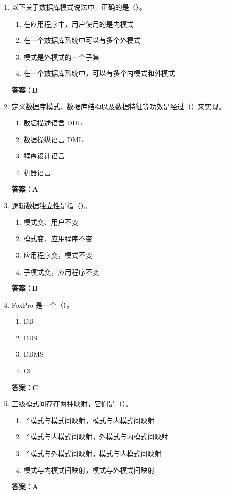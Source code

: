 \documentclass[12pt, a4paper]{article}
\begin{document}
\begin{enumerate}[label=\arabic*.]
	\item 以下关于数据库模式说法中，正确的是（\quad）。
	      \begin{enumerate}
		      \item 在应用程序中，用户使用的是内模式
		      \item 在一个数据库系统中可以有多个外模式
		      \item 模式是外模式的一个子集
		      \item 在一个数据库系统中，可以有多个内模式和外模式
	      \end{enumerate}
	      \textbf{答案：B}

	\item 定义数据库模式、数据库结构以及数据特征等功效是经过（\quad）来实现。
	      \begin{enumerate}
		      \item 数据描述语言 DDL
		      \item 数据操纵语言 DML
		      \item 程序设计语言
		      \item 机器语言
	      \end{enumerate}
	      \textbf{答案：A}

	\item 逻辑数据独立性是指（\quad）。
	      \begin{enumerate}
		      \item 模式变、用户不变
		      \item 模式变、应用程序不变
		      \item 应用程序变，模式不变
		      \item 子模式变，应用程序不变
	      \end{enumerate}
	      \textbf{答案：B}

	\item FoxPro 是一个（\quad）。
	      \begin{enumerate}
		      \item DB
		      \item DBS
		      \item DBMS
		      \item OS
	      \end{enumerate}
	      \textbf{答案：C}

	\item 三级模式间存在两种映射，它们是（\quad）。
	      \begin{enumerate}
		      \item 子模式与模式间映射，模式与内模式间映射
		      \item 子模式与内模式间映射，外模式与内模式间映射
		      \item 子模式与外模式间映射，模式与内模式间映射
		      \item 模式与内模式间映射，模式与外模式间映射
	      \end{enumerate}
	      \textbf{答案：A}


\end{enumerate}
\end{document}
